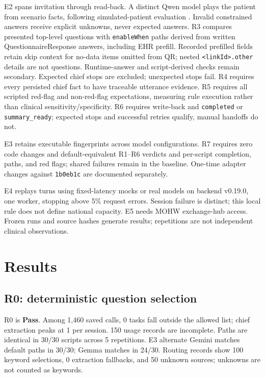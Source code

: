 \documentclass[lineno,pdflatex,sn-basic]{sn-jnl}%
\theoremstyle{thmstyleone}%
\theoremstyle{thmstyletwo}%
\theoremstyle{thmstylethree}%
\newcommand{\RZeroVerdict}{Pass}
\newcommand{\ETwoDetCalls}{1,460}
\newcommand{\ETwoDetChiefMax}{1}
\newcommand{\ETwoDetUsageIncomplete}{150}
\newcommand{\ETwoDetUnexpectedTasks}{0}
\newcommand{\ETwoDetKeywordSources}{100}
\newcommand{\ETwoDetExtractorSources}{0}
\newcommand{\ETwoDetUnknownSources}{50}
\newcommand{\RZeroStableScripts}{30}
\newcommand{\RZeroScripts}{30}
\newcommand{\RZeroRepeats}{5}
\newcommand{\EThreeAlternateDetSamePaths}{30}
\newcommand{\EThreeAlternateDetComparedScripts}{30}
\newcommand{\EThreeLocalDetSamePaths}{24}
\newcommand{\EThreeLocalDetComparedScripts}{30}
\newcommand{\AdapterBaseCommit}{1b0eb1c}
\newcommand{\ELoadStopThreshold}{5\%}
\begin{document}
E2 spans invitation through read-back. A distinct Qwen model plays the patient
from scenario facts, following simulated-patient evaluation
\citep{tuConversationalDiagnosticArtificial2025,johriCraftMd2025,schmidgallAgentClinic2024}.
Invalid constrained answers receive explicit unknowns, never expected answers.
R3 compares presented top-level questions with \texttt{enableWhen} paths derived
from written QuestionnaireResponse answers, including EHR prefill. Recorded
prefilled fields retain skip context for no-data items omitted from QR; nested
\texttt{<linkId>.other} details are not questions. Runtime-answer and script-derived
checks remain secondary. Expected chief stops are excluded; unexpected stops fail.
R4 requires every persisted chief fact to have traceable utterance evidence.
R5 requires all scripted red-flag and non-red-flag expectations, measuring rule
execution rather than clinical sensitivity/specificity. R6 requires write-back
and \texttt{completed} or \texttt{summary\_ready}; expected stops and successful
retries qualify, manual handoffs do not.

E3 retains executable fingerprints across model configurations. R7 requires zero
code changes and default-equivalent R1--R6 verdicts and per-script completion,
paths, and red flags; shared failures remain in the baseline. One-time adapter
changes against \texttt{\AdapterBaseCommit} are documented separately.

E4 replays turns using fixed-latency mocks or real models on backend v0.19.0,
one worker, stopping above \ELoadStopThreshold{} request errors. Session failure
is distinct; this local rule does not define national capacity. E5 needs MOHW
exchange-hub access. Frozen runs and source hashes generate results; repetitions
are not independent clinical observations.

\section{Results}\label{sec:results}

\subsection{R0: deterministic question selection}
R0 is \textbf{\RZeroVerdict{}}. Among \ETwoDetCalls{} saved calls,
\ETwoDetUnexpectedTasks{} tasks fall outside the allowed list; chief extraction
peaks at \ETwoDetChiefMax{} per session. \ETwoDetUsageIncomplete{} usage records
are incomplete. Paths are identical in \RZeroStableScripts{}/\RZeroScripts{}
scripts across \RZeroRepeats{} repetitions. E3 alternate Gemini matches default
paths in \EThreeAlternateDetSamePaths{}/\EThreeAlternateDetComparedScripts{};
Gemma matches in \EThreeLocalDetSamePaths{}/\EThreeLocalDetComparedScripts{}.
Routing records show \ETwoDetKeywordSources{} keyword selections,
\ETwoDetExtractorSources{} extraction fallbacks, and \ETwoDetUnknownSources{}
unknown sources; unknowns are not counted as keywords.
\end{document}
